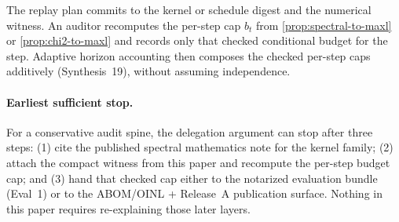 \documentclass[11pt]{article}
\begin{document}
The replay plan commits to the kernel or schedule digest and the numerical witness.
An auditor recomputes the per-step cap $b_t$ from \cref{prop:spectral-to-maxl} or \cref{prop:chi2-to-maxl} and records only that checked conditional budget for the step.
Adaptive horizon accounting then composes the checked per-step caps additively (Synthesis~19), without assuming independence.\cite{series:accountingrulebook,series:condcert}

\paragraph{Earliest sufficient stop.}
For a conservative audit spine, the delegation argument can stop after three steps:
(1) cite the published spectral mathematics note for the kernel family;\cite{series:spectral}
(2) attach the compact witness from this paper and recompute the per-step budget cap; and
(3) hand that checked cap either to the notarized evaluation bundle (Eval~1) or to the ABOM/OINL + Release~A publication surface.\cite{series:notcert,series:abomoinl,series:releaseA}
Nothing in this paper requires re-explaining those later layers.
\end{document}
